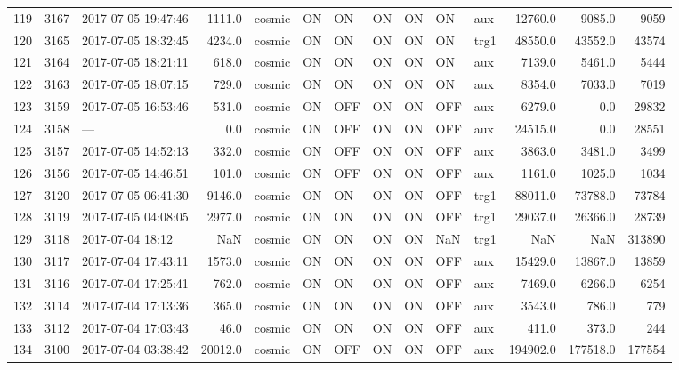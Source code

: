\begin{longtable}{lrlrlllllllrrr}
119 &  3167 &  2017-07-05 19:47:46 &    1111.0 &   cosmic &  ON &   ON &   ON &  ON &   ON &       aux &     12760.0 &       9085.0 &                9059 \\
120 &  3165 &  2017-07-05 18:32:45 &    4234.0 &   cosmic &  ON &   ON &   ON &  ON &   ON &      trg1 &     48550.0 &      43552.0 &               43574 \\
121 &  3164 &  2017-07-05 18:21:11 &     618.0 &   cosmic &  ON &   ON &   ON &  ON &   ON &       aux &      7139.0 &       5461.0 &                5444 \\
122 &  3163 &  2017-07-05 18:07:15 &     729.0 &   cosmic &  ON &   ON &   ON &  ON &   ON &       aux &      8354.0 &       7033.0 &                7019 \\
123 &  3159 &  2017-07-05 16:53:46 &     531.0 &   cosmic &  ON &  OFF &   ON &  ON &  OFF &       aux &      6279.0 &          0.0 &               29832 \\
124 &  3158 &                  --- &       0.0 &   cosmic &  ON &  OFF &   ON &  ON &  OFF &       aux &     24515.0 &          0.0 &               28551 \\
125 &  3157 &  2017-07-05 14:52:13 &     332.0 &   cosmic &  ON &  OFF &   ON &  ON &  OFF &       aux &      3863.0 &       3481.0 &                3499 \\
126 &  3156 &  2017-07-05 14:46:51 &     101.0 &   cosmic &  ON &  OFF &   ON &  ON &  OFF &       aux &      1161.0 &       1025.0 &                1034 \\
127 &  3120 &  2017-07-05 06:41:30 &    9146.0 &   cosmic &  ON &   ON &   ON &  ON &  OFF &      trg1 &     88011.0 &      73788.0 &               73784 \\
128 &  3119 &  2017-07-05 04:08:05 &    2977.0 &   cosmic &  ON &   ON &   ON &  ON &  OFF &      trg1 &     29037.0 &      26366.0 &               28739 \\
129 &  3118 &     2017-07-04 18:12 &       NaN &   cosmic &  ON &   ON &   ON &  ON &  NaN &      trg1 &         NaN &          NaN &              313890 \\
130 &  3117 &  2017-07-04 17:43:11 &    1573.0 &   cosmic &  ON &   ON &   ON &  ON &  OFF &       aux &     15429.0 &      13867.0 &               13859 \\
131 &  3116 &  2017-07-04 17:25:41 &     762.0 &   cosmic &  ON &   ON &   ON &  ON &  OFF &       aux &      7469.0 &       6266.0 &                6254 \\
132 &  3114 &  2017-07-04 17:13:36 &     365.0 &   cosmic &  ON &   ON &   ON &  ON &  OFF &       aux &      3543.0 &        786.0 &                 779 \\
133 &  3112 &  2017-07-04 17:03:43 &      46.0 &   cosmic &  ON &   ON &   ON &  ON &  OFF &       aux &       411.0 &        373.0 &                 244 \\
134 &  3100 &  2017-07-04 03:38:42 &   20012.0 &   cosmic &  ON &  OFF &   ON &  ON &  OFF &       aux &    194902.0 &     177518.0 &              177554 \\
\bottomrule
\end{longtable}

